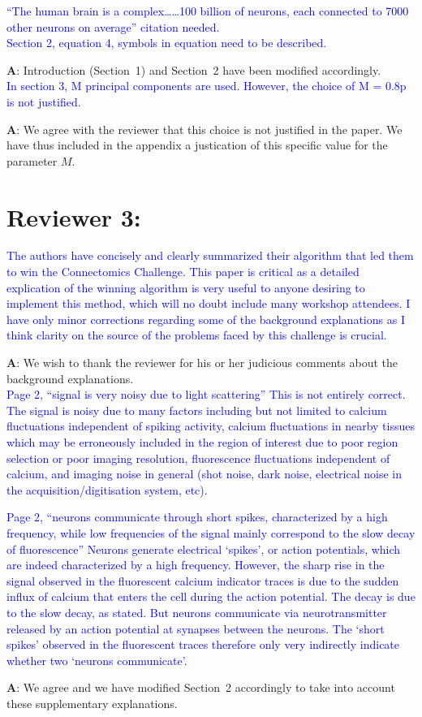 \documentclass[wcp]{jmlr}
\begin{document}
\noindent
\textcolor{blue}{“The human brain is a complex……100 billion of neurons, each connected to 7000 other neurons on average” citation needed.\\
Section 2, equation 4, symbols in equation need to be described.}

\textbf{A}: Introduction (Section~1) and Section~2 have been modified accordingly.\\

\noindent
\textcolor{blue}{In section 3, M principal components are used. However, the choice of M = 0.8p is not justified.}

\textbf{A}: We agree with the reviewer that this choice is not justified in the paper. We have thus included in the appendix a justication of this specific value for the parameter $M$.



\section*{Reviewer 3:}


\textcolor{blue}{The authors have concisely and clearly summarized their algorithm that led them to win the Connectomics Challenge. This paper is critical as a detailed explication of the winning algorithm is very useful to anyone desiring to implement this method, which will no doubt include many workshop attendees.  I have only minor corrections regarding some of the background explanations as I think clarity on the source of the problems faced by this challenge is crucial.}

\textbf{A}: We wish to thank the reviewer for his or her judicious comments about the background explanations.\\

\noindent
\textcolor{blue}{Page 2, “signal is very noisy due to light scattering”  This is not entirely correct.  The signal is noisy due to many factors including but not limited to calcium fluctuations independent of spiking activity, calcium fluctuations in nearby tissues which may be erroneously included in the region of interest due to poor region selection or poor imaging resolution, fluorescence fluctuations independent of calcium, and imaging noise in general (shot noise, dark noise,  electrical noise in the acquisition/digitisation system, etc).}

\noindent
\textcolor{blue}{Page 2, “neurons communicate through short spikes, characterized by a high frequency, while low frequencies of the signal mainly correspond to the slow decay of fluorescence”  Neurons generate electrical ‘spikes’, or action potentials, which are indeed characterized by a high frequency. However, the sharp rise in the signal observed in the fluorescent calcium indicator traces is due to the sudden influx of calcium that enters the cell during the action potential.  The decay is due to the slow decay, as stated.  But neurons communicate via neurotransmitter released by an action potential at synapses between the neurons. The ‘short spikes’ observed in the fluorescent traces therefore only very indirectly indicate whether two ‘neurons communicate’.}

\textbf{A}: We agree and we have modified Section~2 accordingly to take into account these supplementary explanations.\\
\end{document}
